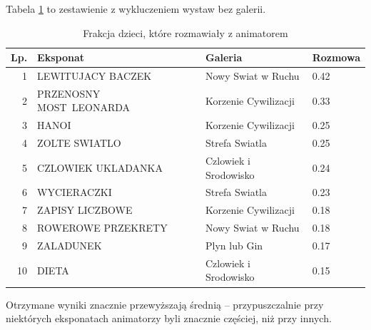 \documentclass[conference]{IEEEtran}
\begin{document}
Tabela \ref{top_animator_b} to zestawienie z wykluczeniem wystaw bez galerii.
\begin{table}[H]
\caption{Frakcja dzieci, które rozmawiały z animatorem}
\label{top_animator_b}
\centering
\begin{tabular}{|r|p{3cm}|l|l|}
\hline
\textbf{Lp.} & \textbf{Eksponat} & \textbf{Galeria} & \textbf{Rozmowa} \\
\hline
1  &       LEWITUJACY BACZEK &    Nowy Swiat w Ruchu & 0.42 \\
2  & PRZENOSNY MOST~LEONARDA &  Korzenie Cywilizacji & 0.33 \\
3  &                   HANOI &  Korzenie Cywilizacji & 0.25 \\
4  &           ZOLTE SWIATLO &        Strefa Swiatla & 0.25 \\
5  &      CZLOWIEK UKLADANKA & Czlowiek i Srodowisko & 0.24 \\
6  &             WYCIERACZKI &        Strefa Swiatla & 0.23 \\
7  &         ZAPISY LICZBOWE &  Korzenie Cywilizacji & 0.18 \\
8  &      ROWEROWE PRZEKRETY &    Nowy Swiat w Ruchu & 0.18 \\
9  &               ZALADUNEK &          Plyn lub Gin & 0.17 \\
10 &                   DIETA & Czlowiek i Srodowisko & 0.15 \\
\hline
\end{tabular}
\end{table}
Otrzymane wyniki znacznie przewyższają średnią -- przypuszczalnie przy niektórych eksponatach animatorzy byli znacznie częściej, niż przy innych.
\end{document}
